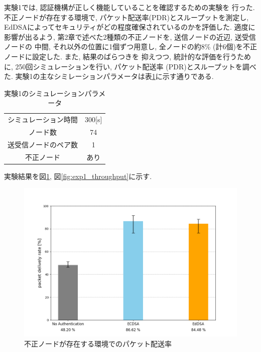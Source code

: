 実験1では, 認証機構が正しく機能していることを確認するための実験を
行った. 不正ノードが存在する環境で, パケット配送率(PDR)とスループットを測定し, 
EdDSAによってセキュリティがどの程度確保されているのかを評価した. 
適度に影響が出るよう, 第2章で述べた2種類の不正ノードを, 送信ノードの近辺, 送受信ノードの
中間, それ以外の位置に1個ずつ用意し, 
全ノードの約8\% (計6個)を不正ノードに設定した. また, 結果のばらつきを
抑えつつ, 統計的な評価を行うために, 250回シミュレーションを行い, 
パケット配送率 (PDR)とスループットを調べた. 
実験1の主なシミレーションパラメータは表\ref{tab:exp1-params}に示す通りである.
\begin{longtable}{cc}
  \caption{実験1のシミュレーションパラメータ}
  \label{tab:exp1-params}
  \endfirsthead
  \hline
  シミュレーション時間 & 300[s] \\
  ノード数 & 74 \\
  送受信ノードのペア数 & 1 \\ 
  不正ノード & あり \\ \hline
\end{longtable}
\vspace{1em}
\indent 実験結果を図\ref{fig:exp1_pdr}, 図\ref{fig:exp1_throughput}に示す. \\[-2.5em]
\begin{figure}
  \centering
  \includegraphics[width=1\textwidth]{figures/exp1_pdr.png}
  \caption{不正ノードが存在する環境でのパケット配送率}
  \label{fig:exp1_pdr}
\end{figure}
\clearpage
